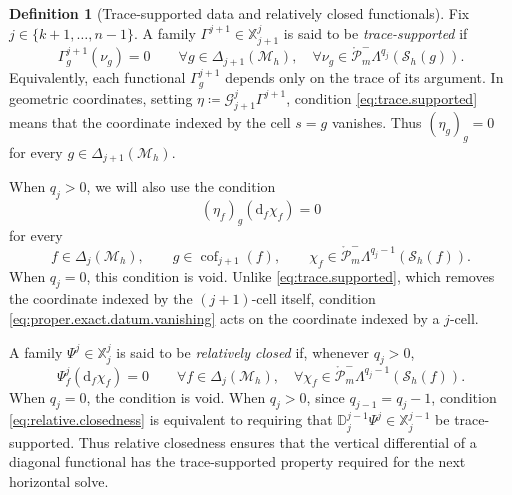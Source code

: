 \documentclass[a4paper,11pt]{article}
\theoremstyle{definition}
\newtheorem{definition}[theorem]{Definition}
\newcommand{\DIFF}{\mathrm{d}}
\newcommand{\Mh}{\mathcal{M}_h}
\newcommand{\Sh}{\mathcal{S}_h}
\newcommand{\FM}[1]{\Delta_{#1}}
\newcommand{\cof}[1]{\operatorname{cof}_{#1}}
\newcommand{\PLtrimz}[2]{\mathring{\mathcal P}_{#1}^{-}\Lambda^{#2}}
\begin{document}
\begin{definition}[Trace-supported data and relatively closed functionals]
Fix $j\in\{k+1,\ldots,n-1\}$.
A family $\Gamma^{j+1}\in\mathbb X_{j+1}^j$ is said to be \emph{trace-supported} if
\begin{equation}\label{eq:trace.supported}
  \Gamma_g^{j+1}(\nu_g)=0
  \qquad
  \forall g\in\FM{j+1}(\Mh),\quad
  \forall
  \nu_g\in
  \PLtrimz{m}{q_j}(\Sh(g)).
\end{equation}
Equivalently, each functional $\Gamma_g^{j+1}$ depends only on the trace of its argument.
In geometric coordinates, setting $\eta \coloneqq \mathcal G_{j+1}^j\Gamma^{j+1}$, condition \eqref{eq:trace.supported} means that the coordinate indexed by the cell $s=g$ vanishes.
Thus $(\eta_g)_g=0$ for every $g\in\FM{j+1}(\Mh)$.

When $q_j>0$, we will also use the condition
\begin{equation}\label{eq:proper.exact.datum.vanishing}
  (\eta_f)_g(\DIFF_f\chi_f)=0
\end{equation}
for every
\[
  f\in\FM{j}(\Mh),
  \qquad
  g\in\cof{j+1}(f),
  \qquad
  \chi_f\in
  \PLtrimz{m}{q_j-1}(\Sh(f)).
\]
When $q_j=0$, this condition is void.
Unlike \eqref{eq:trace.supported}, which removes the coordinate indexed by the $(j+1)$-cell itself, condition \eqref{eq:proper.exact.datum.vanishing} acts on the coordinate indexed by a $j$-cell.

A family $\Psi^j\in\mathbb X_j^j$ is said to be \emph{relatively closed} if, whenever $q_j>0$,
\begin{equation}\label{eq:relative.closedness}
  \Psi_f^j(\DIFF_f\chi_f)=0
  \qquad
  \forall f\in\FM{j}(\Mh),\quad
  \forall
  \chi_f\in
  \PLtrimz{m}{q_j-1}(\Sh(f)).
\end{equation}
When $q_j=0$, the condition is void.
When $q_j>0$, since $q_{j-1}=q_j-1$, condition \eqref{eq:relative.closedness} is equivalent to requiring that $\mathbb D_j^{j-1}\Psi^j\in\mathbb X_j^{j-1}$ be trace-supported.
Thus relative closedness ensures that the vertical differential of a diagonal functional has the trace-supported property required for the next horizontal solve.
\end{definition}
\end{document}
